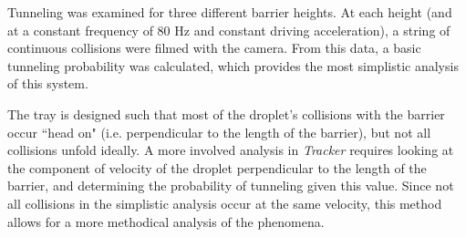Tunneling was examined for three different barrier heights. At each height (and at a constant frequency of 80 Hz and constant driving acceleration), a string of continuous collisions were filmed with the camera. From this data, a basic tunneling probability was calculated, which provides the most simplistic analysis of this system. 

The tray is designed such that most of the droplet's collisions with the barrier occur ``head on" (i.e. perpendicular to the length of the barrier), but not all collisions unfold ideally. A more involved analysis in \textit{Tracker} requires looking at the component of velocity of the droplet perpendicular to the length of the barrier, and determining the probability of tunneling given this value. Since not all collisions in the simplistic analysis occur at the same velocity, this method allows for a more methodical analysis of the phenomena. 
